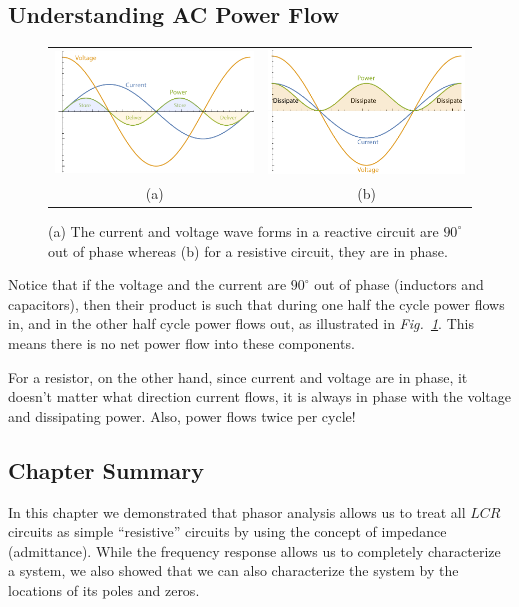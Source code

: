 \subsection{Understanding AC Power Flow}
\begin{figure}[tb]
\centering
\begin{tabular}{cc}
\includegraphics[width=.45\columnwidth]{cap_power} &
\includegraphics[width=.45\columnwidth]{res_power}\\
(a) & (b)\\
\end{tabular}
\caption{(a) The current and voltage wave forms in a reactive circuit are $90^\circ$ out of phase whereas (b) for a resistive circuit, they are in phase.}
\label{fig:powerflow}
\end{figure}
Notice that if the voltage and the current are $90^\circ$ out of phase (inductors and capacitors), then their product is such that during one half the cycle power flows in, and in the other half cycle power flows out, as illustrated in \emph{Fig.~\ref{fig:powerflow}}.  This means there is no net power flow into these components.

For a resistor, on the other hand, since current and voltage are in phase, it doesn't matter what direction current flows, it is always in phase with the voltage and dissipating power.  Also, power flows twice per cycle!
\subsection{Chapter Summary}
In this chapter we demonstrated that phasor analysis allows us to treat all $LCR$ circuits as simple “resistive” circuits by using the concept of impedance (admittance).  While the frequency response allows us to completely characterize a system, we also showed that we can also characterize the system by the locations of its poles and zeros.

